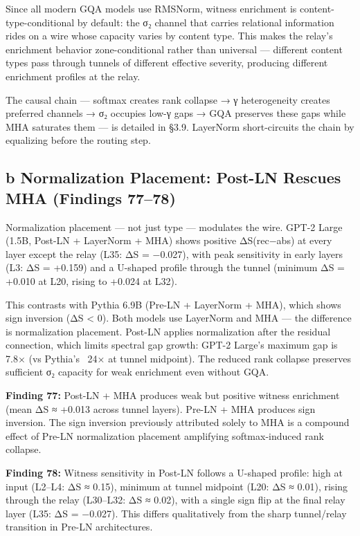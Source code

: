 \documentclass[12pt]{article}
\begin{document}
Since all modern GQA models use RMSNorm, witness enrichment is content-type-conditional by default: the σ₂ channel that carries relational information rides on a wire whose capacity varies by content type. This makes the relay's enrichment behavior zone-conditional rather than universal — different content types pass through tunnels of different effective severity, producing different enrichment profiles at the relay.

The causal chain — softmax creates rank collapse → γ heterogeneity creates preferred channels → σ₂ occupies low-γ gaps → GQA preserves these gaps while MHA saturates them — is detailed in §3.9. LayerNorm short-circuits the chain by equalizing before the routing step.

\subsection{b Normalization Placement: Post-LN Rescues MHA (Findings 77–78)}

Normalization placement — not just type — modulates the wire. GPT-2 Large (1.5B, Post-LN + LayerNorm + MHA) shows positive ΔS(rec−abs) at every layer except the relay (L35: ΔS = −0.027), with peak sensitivity in early layers (L3: ΔS = +0.159) and a U-shaped profile through the tunnel (minimum ΔS = +0.010 at L20, rising to +0.024 at L32).

This contrasts with Pythia 6.9B (Pre-LN + LayerNorm + MHA), which shows sign inversion (ΔS < 0). Both models use LayerNorm and MHA — the difference is normalization placement. Post-LN applies normalization after the residual connection, which limits spectral gap growth: GPT-2 Large's maximum gap is 7.8× (vs Pythia's ~24× at tunnel midpoint). The reduced rank collapse preserves sufficient σ₂ capacity for weak enrichment even without GQA.

\textbf{Finding 77:} Post-LN + MHA produces weak but positive witness enrichment (mean ΔS ≈ +0.013 across tunnel layers). Pre-LN + MHA produces sign inversion. The sign inversion previously attributed solely to MHA is a compound effect of Pre-LN normalization placement amplifying softmax-induced rank collapse.

\textbf{Finding 78:} Witness sensitivity in Post-LN follows a U-shaped profile: high at input (L2–L4: ΔS ≈ 0.15), minimum at tunnel midpoint (L20: ΔS ≈ 0.01), rising through the relay (L30–L32: ΔS ≈ 0.02), with a single sign flip at the final relay layer (L35: ΔS = −0.027). This differs qualitatively from the sharp tunnel/relay transition in Pre-LN architectures.
\end{document}

